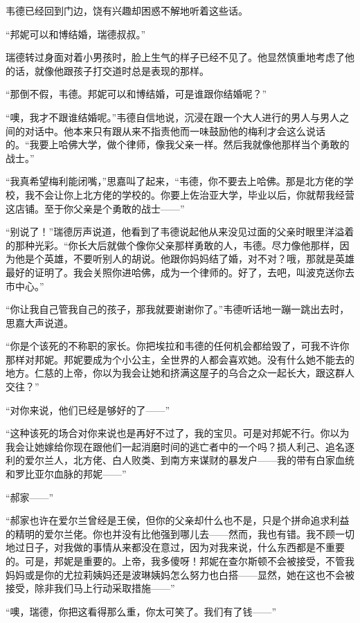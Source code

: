 \par 韦德已经回到门边，饶有兴趣却困惑不解地听着这些话。
\par “邦妮可以和博结婚，瑞德叔叔。”
\par 瑞德转过身面对着小男孩时，脸上生气的样子已经不见了。他显然慎重地考虑了他的话，就像他跟孩子打交道时总是表现的那样。
\par “那倒不假，韦德。邦妮可以和博结婚，可是谁跟你结婚呢？”
\par “噢，我才不跟谁结婚呢。”韦德自信地说，沉浸在跟一个大人进行的男人与男人之间的对话中。他本来只有跟从来不指责他而一味鼓励他的梅利才会这么说话的。“我要上哈佛大学，做个律师，像我父亲一样。然后我就像他那样当个勇敢的战士。”
\par “我真希望梅利能闭嘴，”思嘉叫了起来，“韦德，你不要去上哈佛。那是北方佬的学校，我不会让你上北方佬的学校的。你要上佐治亚大学，毕业以后，你就帮我经营这店铺。至于你父亲是个勇敢的战士——”
\par “别说了！”瑞德厉声说道，他看到了韦德说起他从来没见过面的父亲时眼里洋溢着的那种光彩。“你长大后就做个像你父亲那样勇敢的人，韦德。尽力像他那样，因为他是个英雄，不要听别人的胡说。他跟你妈妈结了婚，对不对？哦，那就是英雄最好的证明了。我会关照你进哈佛，成为一个律师的。好了，去吧，叫波克送你去市中心。”
\par “你让我自己管我自己的孩子，那我就要谢谢你了。”韦德听话地一蹦一跳出去时，思嘉大声说道。
\par “你是个该死的不称职的家长。你把埃拉和韦德的任何机会都给毁了，可我不许你那样对邦妮。邦妮要成为个小公主，全世界的人都会喜欢她。没有什么她不能去的地方。仁慈的上帝，你以为我会让她和挤满这屋子的乌合之众一起长大，跟这群人交往？”
\par “对你来说，他们已经是够好的了——”
\par “这种该死的场合对你来说也是再好不过了，我的宝贝。可是对邦妮不行。你以为我会让她嫁给你现在跟他们一起消磨时间的逃亡者中的一个吗？损人利己、追名逐利的爱尔兰人，北方佬、白人败类、到南方来谋财的暴发户——我的带有白家血统和罗比亚尔血脉的邦妮——”
\par “郝家——”
\par “郝家也许在爱尔兰曾经是王侯，但你的父亲却什么也不是，只是个拼命追求利益的精明的爱尔兰佬。你也并没有比他强到哪儿去——然而，我也有错。我不顾一切地过日子，对我做的事情从来都没在意过，因为对我来说，什么东西都是不重要的。可是，邦妮是重要的。上帝，我多傻呀！邦妮在查尔斯顿不会被接受，不管我妈妈或是你的尤拉莉姨妈还是波琳姨妈怎么努力也白搭——显然，她在这也不会被接受，除非我们马上行动采取措施——”
\par “噢，瑞德，你把这看得那么重，你太可笑了。我们有了钱——”

